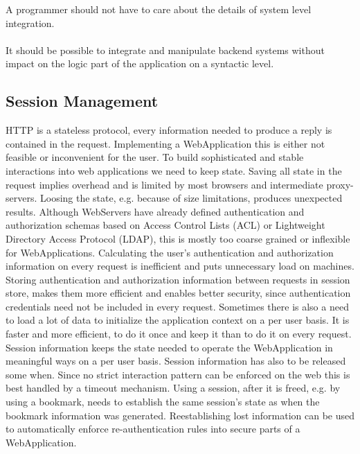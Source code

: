 A programmer should not have to care about the details of system level
integration.\\
\\
It should be possible to integrate and manipulate backend systems
without impact on the logic part of the application on a syntactic level.

\subsection{Session Management}
HTTP is a stateless protocol, every information needed to produce a reply is
contained in the request. Implementing a WebApplication this is either not
feasible or inconvenient for the user. To build sophisticated and stable
interactions into web applications we need to keep state. Saving all state in
the request implies overhead and is limited by most browsers and intermediate
proxy-servers. Loosing the state, e.g. because of size limitations, produces
unexpected results. Although WebServers have already defined authentication and
authorization schemas based on Access Control Lists (ACL) or Lightweight
Directory Access Protocol (LDAP), this is mostly too coarse grained or
inflexible for WebApplications. Calculating the user’s authentication and
authorization information on every request is inefficient and puts unnecessary
load on machines. Storing authentication and authorization information between
requests in session store, makes them more efficient and enables better
security, since authentication credentials need not be included in every
request. Sometimes there is also a need to load a lot of data to initialize the
application context on a per user basis. It is faster and more efficient, to do
it once and keep it than to do it on every request. Session information keeps
the state needed to operate the WebApplication in meaningful ways on a per user
basis. Session information has also to be released some when. Since no strict
interaction pattern can be enforced on the web this is best handled by a timeout
mechanism. Using a session, after it is freed, e.g. by using a bookmark, needs
to establish the same session’s state as when the bookmark information was
generated. Reestablishing lost information can be used to automatically enforce
re-authentication rules into secure parts of a WebApplication.

